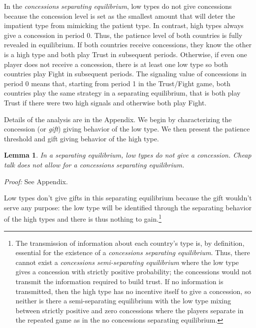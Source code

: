 \documentclass[12pt, letterpaper]{article}
\newtheorem{lemma}{Lemma}
\begin{document}
In the \emph{concessions separating equilibrium}, low types do not give concessions because the concession level is set as the smallest amount that will deter the impatient type from mimicking the patient type. In contrast, high types always give a concession in period 0. Thus, the patience level of both countries is fully revealed in equilibrium. If both countries receive concessions, they know the other is a high type and both play Trust in subsequent periods. Otherwise, if even one player does not receive a concession, there is at least one low type so both countries play Fight in subsequent periods. The signaling value of concessions in period 0 means that, starting from period 1 in the Trust/Fight game, both countries play the same strategy in a separating equilibrium, that is both play Trust if there were two high signals and otherwise both play Fight.

Details of the analysis are in the Appendix. We begin by characterizing the concession (or \emph{gift}) giving behavior of the low type. We then present the patience threshold and gift giving behavior of the high type.

\begin{lemma}
	In a separating equilibrium, low types do not give a concession. Cheap talk does not allow for a concessions separating equilibrium.
	\label{lemma:3}
\end{lemma}
\emph{Proof:} See Appendix.

Low types don't give gifts in this separating equilibrium because the gift wouldn't serve any purpose: the low type will be identified through the separating behavior of the high types and there is thus nothing to gain.\footnote{The transmission of information about each country's type is, by definition, essential for the existence of a \emph{concessions separating equilibrium}. Thus, there cannot exist a \emph{concessions semi-separating equilibrium} where the low type gives a concession with strictly positive probability; the concessions would not transmit the information required to build trust. If no information is transmitted, then the high type has no incentive itself to give a concession, so neither is there a semi-separating equilibrium with the low type mixing between strictly positive and zero concessions where the players separate in the repeated game as in the no concessions separating equilibrium.}
\end{document}
